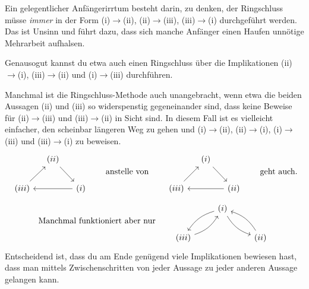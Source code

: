 \begin{bem}
    Ein gelegentlicher Anfängerirrtum besteht darin, zu denken, der Ringschluss müsse \emph{immer} in der Form (i)$\to$(ii), (ii)$\to$(iii), (iii)$\to$(i) durchgeführt werden. Das ist Unsinn und führt dazu, dass sich manche Anfänger einen Haufen unnötige Mehrarbeit aufhalsen.
    
    Genausogut kannst du etwa auch einen Ringschluss über die Implikationen (ii)$\to$(i), (iii)$\to$(ii) und (i)$\to$(iii) durchführen.
    
    Manchmal ist die Ringschluss-Methode auch unangebracht, wenn etwa die beiden Aussagen (ii) und (iii) so widerspenstig gegeneinander sind, dass keine Beweise für (ii)$\to$(iii) und (iii)$\to$(ii) in Sicht sind. In diesem Fall ist es vielleicht einfacher, den scheinbar längeren Weg zu gehen und (i)$\to$(ii), (ii)$\to$(i), (i)$\to$(iii) und (iii)$\to$(i) zu beweisen.
    \[\begin{tikzcd}[column sep=small]
        & (ii) \ar[rd] & \\
        (iii)\ar[ru] && (i)\ar[ll]
    \end{tikzcd}\qquad\text{anstelle von}\qquad\begin{tikzcd}[column sep=small]
        & (i) \ar[rd] & \\
        (iii)\ar[ru] && (ii)\ar[ll]    
    \end{tikzcd}\qquad\text{geht auch.}\]
    \[\text{Manchmal funktioniert aber nur}\qquad \begin{tikzcd}
        & (i) \ar[ld, bend right=20]  \ar[rd, bend right=20] & \\
        (iii)\ar[ru, bend right=20] && (ii) \ar[lu, bend right=20]
    \end{tikzcd}\]
    Entscheidend ist, dass du am Ende genügend viele Implikationen bewiesen hast, dass man mittels Zwischenschritten von jeder Aussage zu jeder anderen Aussage gelangen kann.


\end{bem}
